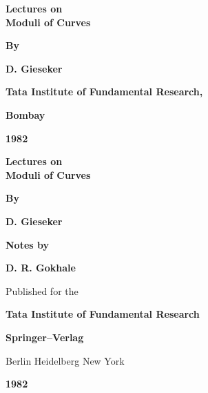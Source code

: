 \thispagestyle{empty}

\begin{center}
{\Large\bf Lectures on}\\[5pt]
{\Large\bf Moduli of Curves}
\vskip 1cm


{\bf By}
\medskip

{\large\bf D. Gieseker}
\vfill

{\bf Tata Institute of Fundamental Research,}
\medskip

{\bf Bombay}


{\bf 1982}
\end{center}
\eject

\thispagestyle{empty}
\begin{center}
{\Large\bf Lectures on}\\[5pt]
{\Large\bf Moduli of Curves}
\vskip 1cm

{\bf By}
\medskip

{\large\bf D. Gieseker}
\vfill



{\bf Notes by}\\ 
\medskip

{\large\bf D. R. Gokhale}\\
\vfill


Published for the \\
\medskip


{\bf Tata Institute of Fundamental Research}

{\bf Springer--Verlag}
\medskip

Berlin Heidelberg New York
\medskip

{\bf 1982}
\end{center}
\eject

